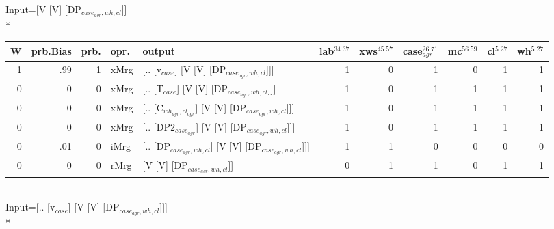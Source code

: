 \begingroup\scriptsize Input=[V [V] [DP$_{case_{agr},wh,cl}$]]\\*
\begin{tabularx}{\linewidth}{rrrlXrrrrrr}
\hline
   W &   prb.Bias &   prb. & opr.   & output                                               &   lab$^{34.37}$ &   xws$^{45.57}$ &   case$_{agr}^{26.71}$ &   mc$^{56.59}$ &   cl$^{5.27}$ &   wh$^{5.27}$ \\
\hline
   1 &       .99 &   1 & xMrg & [.. [v$_{case}$] [V [V] [DP$_{case_{agr},wh,cl}$]]]            &             1 &             0 &                  1 &            0 &        1 &        1 \\
   0 &       0 &   0 & xMrg & [.. [T$_{case}$] [V [V] [DP$_{case_{agr},wh,cl}$]]]            &             1 &             0 &                  1 &            1 &        1 &        1 \\
   0 &       0 &   0 & xMrg & [.. [C$_{wh_{agr},cl_{agr}}$] [V [V] [DP$_{case_{agr},wh,cl}$]]]   &             1 &             0 &                  1 &            1 &        1 &        1 \\
   0 &       0 &   0 & xMrg & [.. [DP2$_{case_{agr}}$] [V [V] [DP$_{case_{agr},wh,cl}$]]]      &             1 &             0 &                  1 &            1 &        1 &        1 \\
   0 &       .01 &   0 & iMrg & [.. [DP$_{case_{agr},wh,cl}$] [V [V] [DP$_{case_{agr},wh,cl}$]]] &             1 &             1 &                  0 &            0 &        0 &        0 \\
   0 &       0 &   0 & rMrg & [V [V] [DP$_{case_{agr},wh,cl}$]]                          &             0 &             1 &                  1 &            0 &        1 &        1 \\
\hline
\end{tabularx}\endgroup\\
\begingroup\scriptsize Input=[.. [v$_{case}$] [V [V] [DP$_{case_{agr},wh,cl}$]]]\\*
